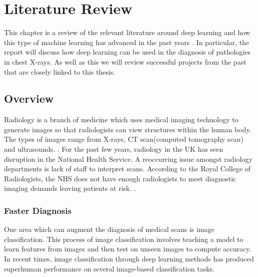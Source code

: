 


\chapter{Literature Review}
This chapter is a review of the relevant literature around deep learning and how this type of machine learning has advanced in the past years . In particular, the report will discuss how deep learning can be used in the diagnosis of pathologies in chest X-rays. As well as this we will review successful projects from the past that are closely linked to this thesis.

\section{Overview}

Radiology is a branch of medicine which uses medical imaging technology to generate images so that radiologists can view structures within the human body. The types of images range from X-rays, CT scan(computed tomography scan) and ultrasounds. \cite{bradley2008history}. For the past few years, radiology in the UK  has seen disruption in the National Health Service. A reoccurring issue amongst radiology departments is lack of staff to interpret scans. According to the Royal College of Radiologists, the NHS does not have enough radiologists to meet diagnostic imaging demands leaving patients at risk. \cite{rimmer2017radiologist}. 
\space
\subsection{Faster Diagnosis}
One area which can augment the diagnosis of medical scans is image classification. This process of image classification involves teaching a model to learn features from images and then test on unseen images to compute accuracy. In recent times, image classification through deep learning methods has produced  superhuman performance on several image-based classification tasks\cite{krizhevsky2012imagenet}.